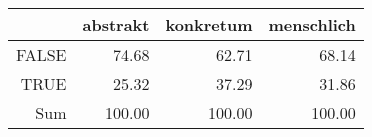 \begin{tabular}{rrrr}
  \hline
 & abstrakt & konkretum & menschlich \\ 
  \hline
FALSE & 74.68 & 62.71 & 68.14 \\ 
  TRUE & 25.32 & 37.29 & 31.86 \\ 
  Sum & 100.00 & 100.00 & 100.00 \\ 
   \hline
\end{tabular}
